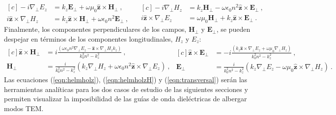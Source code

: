 \begin{equation*}
\begin{aligned}[c]
	 -i\nabla_\perp E_z &= k_z\textbf{E}_\perp +\omega \mu_0 \hat{\textbf{z}} \times \textbf{H}_\perp \ ,
	 	  	 \\
	 	  	i\hat{\textbf{z}} \times \nabla_\perp H_z &= k_z \hat{\textbf{z}} \times\textbf{H}_\perp + \omega\epsilon_0 n^2 \textbf{E}_\perp \ ,
\end{aligned} 
\quad
\begin{aligned}[c]
	-i \nabla_\perp H_z &= k_z \textbf{H}_\perp - \omega \epsilon_0 n^2  \hat{\textbf{z}} \times \textbf{E}_\perp \ ,
	\\
	i\hat{\textbf{z}} \times\nabla_\perp E_z &=  \omega \mu_0 \textbf{H}_\perp+k_z  \hat{\textbf{z}} \times \textbf{E}_\perp \ .
\end{aligned}
\end{equation*}
Finalmente, los componentes perpendiculares de los campos, $\textbf{H}_\perp$ y $\textbf{E}_\perp$, se pueden despejar en términos de los componentes longitudinales, $H_z$ y $E_z$:
\begin{equation}
\begin{aligned}[c]
 \hat{\textbf{z}} \times \textbf{H}_\perp &= i\frac{(\omega\epsilon_0 n^2 \nabla_\perp E_z  - \hat{\textbf{z}} \times \nabla_\perp H_z k_z)}{k_0^2 n^2 - k_z^2} \ ,
 \\
\textbf{H}_\perp &= \frac{i}{k_0^2 n^2 - k_z^2}\left(k_z\nabla_\perp H_z + \omega \epsilon_0 n^2\hat{\textbf{z}} \times \nabla_\perp E_z\right) \ ,
\end{aligned}
\begin{aligned}[c]
	\hat{\textbf{z}} \times \textbf{E}_\perp &= -i\frac{(k_z\hat{\textbf{z}} \times \nabla_\perp E_z + \omega\mu_0 \nabla_\perp H_z)  }{k_0^2 n^2 - k_z^2} \ ,
	\\
\textbf{E}_\perp &= \frac{i}{k_0^2 n^2 - k_z^2}\left(k_z \nabla_\perp E_z - \omega\mu_0 \hat{\textbf{z}} \times \nabla_\perp H_z\right) \ . \label{eqn:transversal}
\end{aligned}
\end{equation}
Las ecuaciones (\ref{eqn:helmholz}), (\ref{eqn:helmholzH}) y (\ref{eqn:transversal}) serán las herramientas analíticas para los dos casos de estudio de las siguientes secciones y permiten visualizar la imposibilidad de las guías de onda dieléctricas de albergar modos TEM.
